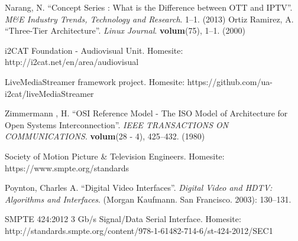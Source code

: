 \documentclass[english,final]{setup/eetac_tfc_pfc}
\begin{document}
%  

\cleardoublepage
{}
\begin{thebibliography}{2}



Narang, N.
``Concept Series : What is the Difference between OTT and IPTV''. {\it M\&E Industry Trends, Technology and Research}.
1--1. (2013) 
Ortiz Ramirez, A.
``Three-Tier Architecture''. {\it Linux Journal}.
{\bf volum}(75),
1--1. (2000) 

i2CAT Foundation - Audiovisual Unit. Homesite: http://i2cat.net/en/area/audiovisual

LiveMediaStreamer framework project. Homesite: https://github.com/ua-i2cat/liveMediaStreamer

Zimmermann , H.
``OSI Reference Model - The ISO Model of Architecture for Open Systems Interconnection''. {\it IEEE TRANSACTIONS ON COMMUNICATIONS}.
{\bf volum}(28 - 4),
425--432. (1980) 

Society of Motion Picture \& Television Engineers. Homesite: https://www.smpte.org/standards
\end{thebibliography}

Poynton, Charles A.
``Digital Video Interfaces''. {\it Digital Video and HDTV: Algorithms and Interfaces}.
(Morgan Kaufmann. San Francisco. 2003): 130--131.

SMPTE 424:2012
3 Gb/s Signal/Data Serial Interface. Homesite: http://standards.smpte.org/content/978-1-61482-714-6/st-424-2012/SEC1
\end{document}
